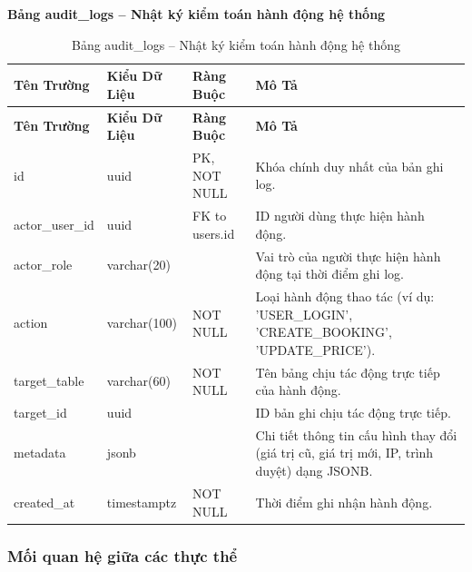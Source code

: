 \textbf{Bảng audit\_logs -- Nhật ký kiểm toán hành động hệ thống}
\label{table:audit_logs}
\begin{longtable}{|p{3cm}|p{2.5cm}|p{3.5cm}|p{5cm}|}
\caption{Bảng audit\_logs -- Nhật ký kiểm toán hành động hệ thống} \\
\hline
\textbf{Tên Trường} & \textbf{Kiểu Dữ Liệu} & \textbf{Ràng Buộc} & \textbf{Mô Tả} \\
\hline
\endfirsthead
\hline
\textbf{Tên Trường} & \textbf{Kiểu Dữ Liệu} & \textbf{Ràng Buộc} & \textbf{Mô Tả} \\
\hline
\endhead
id & uuid & PK, NOT NULL & Khóa chính duy nhất của bản ghi log. \\
\hline
actor\_user\_id & uuid & FK to users.id & ID người dùng thực hiện hành động. \\
\hline
actor\_role & varchar(20) & & Vai trò của người thực hiện hành động tại thời điểm ghi log. \\
\hline
action & varchar(100) & NOT NULL & Loại hành động thao tác (ví dụ: 'USER\_LOGIN', 'CREATE\_BOOKING', 'UPDATE\_PRICE'). \\
\hline
target\_table & varchar(60) & NOT NULL & Tên bảng chịu tác động trực tiếp của hành động. \\
\hline
target\_id & uuid & & ID bản ghi chịu tác động trực tiếp. \\
\hline
metadata & jsonb & & Chi tiết thông tin cấu hình thay đổi (giá trị cũ, giá trị mới, IP, trình duyệt) dạng JSONB. \\
\hline
created\_at & timestamptz & NOT NULL & Thời điểm ghi nhận hành động. \\
\end{longtable}

\subsubsection{Mối quan hệ giữa các thực thể}
\label{sec:entity_relationships}

